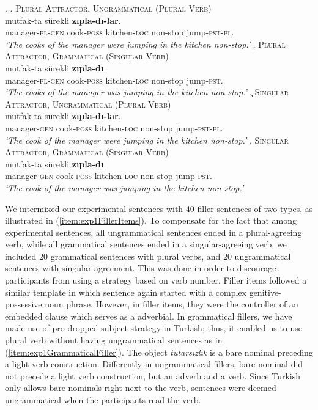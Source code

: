 \documentclass[doc,a4paper,man,natbib,floatsintext,noextraspace]{apa6}\usepackage[]{graphicx}\usepackage[]{color}
\begin{document}
\ex. \label{item:exp1ExperimentalItems}
%
\a. \textsc{Plural Attractor, Ungrammatical (Plural Verb)} \label{item:exp1expitem-plpl}\\ 
   mutfak-ta sürekli \textbf{zıpla-dı-lar}.\\ 
  manager-\textsc{pl}-\textsc{gen}  cook-\textsc{poss} kitchen-\textsc{loc} non-stop  jump-\textsc{pst}-\textsc{pl}.\\
  \glt \textit{`The cooks of the manager were jumping in the kitchen non-stop.'}
%
\b. \textsc{Plural Attractor, Grammatical (Singular Verb)} \label{item:exp1expitem-plsg}\\ 
   mutfak-ta sürekli \textbf{zıpla-dı}.\\ 
  manager-\textsc{pl}-\textsc{gen}  cook-\textsc{poss} kitchen-\textsc{loc} non-stop  jump-\textsc{pst}.\\
  \glt \textit{`The cooks of the manager was jumping in the kitchen non-stop.'}
%
\c. \textsc{Singular Attractor, Ungrammatical (Plural Verb)} \label{item:exp1expitem-sgpl}\\ 
   mutfak-ta sürekli \textbf{zıpla-dı-lar}.\\ 
  manager-\textsc{gen}  cook-\textsc{poss} kitchen-\textsc{loc} non-stop  jump-\textsc{pst}-\textsc{pl}.\\
  \glt \textit{`The cook of the manager were jumping in the kitchen non-stop.'}
%
\d. \textsc{Singular Attractor, Grammatical (Singular Verb)}\label{item:exp1expitem-sgsg}\\ 
   mutfak-ta sürekli \textbf{zıpla-dı}. \\ 
  manager-\textsc{gen}  cook-\textsc{poss} kitchen-\textsc{loc} non-stop  jump-\textsc{pst}.\\
  \glt \textit{`The cook of the manager was jumping in the kitchen non-stop.'}

We intermixed our experimental sentences with 40 filler sentences of two types, as illustrated in (\ref{item:exp1FillerItems}). 
To compensate for the fact that among experimental sentences, all ungrammatical sentences ended in a plural-agreeing verb, while all grammatical sentences ended in a singular-agreeing verb, we included 20 grammatical sentences with plural verbs, and 20 ungrammatical sentences with singular agreement. 
This was done in order to discourage participants from using a strategy based on verb number. 
Filler items followed a similar template in which sentence again started with a complex genitive-possessive noun phrase. 
However, in filler items, they were the controller of an embedded clause which serves as a adverbial. 
In grammatical fillers, we have made use of pro-dropped subject strategy in Turkish; thus, it enabled us to use plural verb without having ungrammatical sentences as in (\ref{item:exp1GrammaticalFiller}). The object \textit{tutarsızlık} is a bare nominal preceding a light verb construction. 
Differently in ungrammatical fillers, bare nominal did not precede a light verb construction, but an adverb and a verb. Since Turkish only allows bare nominals right next to the verb, sentences were deemed ungrammatical when the participants read the verb. 
\end{document}
